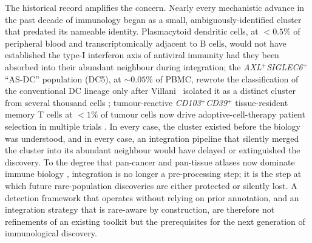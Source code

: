 The historical record amplifies the concern. Nearly every
mechanistic advance in the past decade of immunology began as a
small, ambiguously-identified cluster that predated its nameable
identity. Plasmacytoid dendritic cells, at $<\!0.5\%$ of peripheral
blood and transcriptomically adjacent to B cells, would not have
established the type-I interferon axis of antiviral immunity had
they been absorbed into their abundant neighbour during integration;
the \textit{AXL}$^+$\textit{SIGLEC6}$^+$ ``AS-DC'' population (DC5),
at $\sim\!0.05\%$ of PBMC, rewrote the classification of the
conventional DC lineage only after Villani \etal\ isolated it as a
distinct cluster from several thousand cells
\citep{villani2017single}; tumour-reactive \textit{CD103$^+$CD39$^+$}
tissue-resident memory T cells at $<\!1\%$ of tumour cells now drive
adoptive-cell-therapy patient selection in multiple trials
\citep{duhen2018coexpression}. In every case, the cluster existed
before the biology was understood, and in every case, an integration
pipeline that silently merged the cluster into its abundant
neighbour would have delayed or extinguished the discovery. To the
degree that pan-cancer and pan-tissue atlases now dominate immune
biology \citep{kang2024integrated, cheng2021pancancer,
zheng2021pancancer}, integration is no longer a pre-processing step;
it is the step at which future rare-population discoveries are
either protected or silently lost. A detection framework that
operates without relying on prior annotation, and an integration
strategy that is rare-aware by construction, are therefore not
refinements of an existing toolkit but the prerequisites for the
next generation of immunological discovery.

